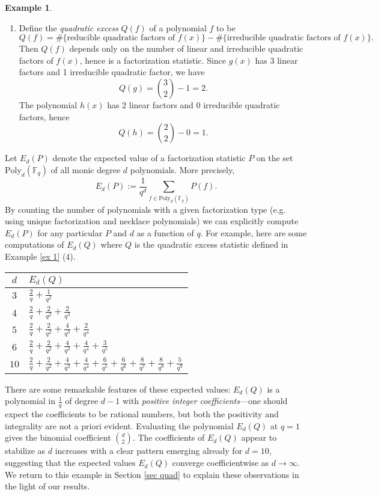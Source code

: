 \documentclass[submission]{FPSAC2018}
\theoremstyle{definition}
\newtheorem{example}[thm]{Example}
\numberwithin{equation}{section}
\def\FF{\mathbb{F}}
\newcommand{\poly}{\mathrm{Poly}}
\begin{document}
\begin{example}
\begin{enumerate}[leftmargin=*]
    \item Define the \emph{quadratic excess} $Q(f)$ of a polynomial $f$ to be
    \[
        Q(f) = \#\{\text{reducible quadratic factors of $f(x)$}\} - \#\{\text{irreducible quadratic factors of $f(x)$}\}.
    \]
    Then $Q(f)$ depends only on the number of linear and irreducible quadratic factors of $f(x)$, hence is a factorization statistic. Since $g(x)$ has 3 linear factors and 1 irreducible quadratic factor, we have
    \[
        Q(g) = \binom{3}{2} - 1 = 2.
    \]
    The polynomial $h(x)$ has 2 linear factors and 0 irreducible quadratic factors, hence
    \[
        Q(h) = \binom{2}{2} - 0 = 1.
    \]
\end{enumerate}

\end{example}

Let $E_d(P)$ denote the expected value of a factorization statistic $P$ on the set $\poly_d(\FF_q)$ of all monic degree $d$ polynomials. More precisely,
\[
    E_d(P) := \frac{1}{q^d}\sum_{f\in \poly_d(\FF_q)}P(f).
\]
By counting the number of polynomials with a given factorization type (e.g. using unique factorization and necklace polynomials) we can explicitly compute $E_d(P)$ for any particular $P$ and $d$ as a function of $q$. For example, here are some computations of $E_d(Q)$ where $Q$ is the quadratic excess statistic defined in Example \ref{ex 1} (4).
\begin{center}
\begin{tabular}{c|l}
    $d$ & $E_d(Q)$\\
\hline
    $3$ & $\tfrac{2}{q} + \tfrac{1}{q^2}$ \\
    $4$ & $\tfrac{2}{q} + \tfrac{2}{q^2} + \tfrac{2}{q^3}$\\
    $5$ & $\tfrac{2}{q} + \tfrac{2}{q^2} + \tfrac{4}{q^3} + \tfrac{2}{q^4}$\\
    $6$ & $\tfrac{2}{q} + \tfrac{2}{q^2} + \tfrac{4}{q^3} + \tfrac{4}{q^4} + \tfrac{3}{q^5}$\\
    $10$ & $\tfrac{2}{q} + \tfrac{2}{q^2} + \tfrac{4}{q^3} + \tfrac{4}{q^4} + \tfrac{6}{q^5} + \tfrac{6}{q^6} + \tfrac{8}{q^7} + \tfrac{8}{q^8} + \tfrac{5}{q^9}$\\
\end{tabular}
\end{center}

\noindent There are some remarkable features of these expected values: $E_d(Q)$ is a polynomial in $\frac{1}{q}$ of degree $d - 1$ with \emph{positive integer coefficients}---one should expect the coefficients to be rational numbers, but both the positivity and integrality are not a priori evident. Evaluating the polynomial $E_d(Q)$ at $q = 1$ gives the binomial coefficient $\binom{d}{2}$. The coefficients of $E_d(Q)$ appear to stabilize as $d$ increases with a clear pattern emerging already for $d = 10$, suggesting that the expected values $E_d(Q)$ converge coefficientwise as $d\rightarrow\infty$. We return to this example in Section \ref{sec quad} to explain these observations in the light of our results.
\end{document}
